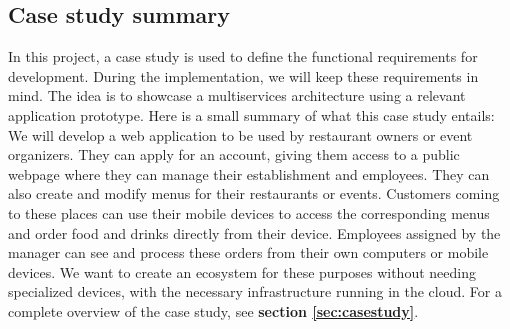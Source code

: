\documentclass[12pt]{article}
\begin{document}
\begin{multicols}{2}

\subsection{Case study summary}
In this project, a case study is used to define the functional requirements for development. During the implementation, we will keep these requirements in mind. The idea is to showcase a multiservices architecture using a relevant application prototype. Here is a small summary of what this case study entails: We will develop a web application to be used by restaurant owners or event organizers. They can apply for an account, giving them access to a public webpage where they can manage their establishment and employees. They can also create and modify menus for their restaurants or events. Customers coming to these places can use their mobile devices to access the corresponding menus and order food and drinks directly from their device. Employees assigned by the manager can see and process these orders from their own computers or mobile devices. We want to create an ecosystem for these purposes without needing specialized devices, with the necessary infrastructure running in the cloud. For a complete overview of the case study, see \textbf{section \ref{sec:casestudy}}.


\end{multicols}
\end{document}
